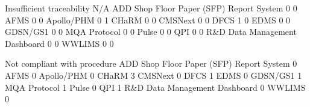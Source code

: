 \documentclass{article}
\begin{document}
\begin{Schunk}
\begin{Soutput}
                                           Insufficient traceability N/A
  ADD Shop Floor Paper (SFP) Report System                         0   0
  AFMS                                                             0   0
  Apollo/PHM                                                       0   1
  CHaRM                                                            0   0
  CMSNext                                                          0   0
  DFCS                                                             1   0
  EDMS                                                             0   0
  GDSN/GS1                                                         0   0
  MQA Protocol                                                     0   0
  Pulse                                                            0   0
  QPI                                                              0   0
  R&D Data Management Dashboard                                    0   0
  WWLIMS                                                           0   0
                                          
                                           Not compliant with procedure
  ADD Shop Floor Paper (SFP) Report System                            0
  AFMS                                                                0
  Apollo/PHM                                                          0
  CHaRM                                                               3
  CMSNext                                                             0
  DFCS                                                                1
  EDMS                                                                0
  GDSN/GS1                                                            1
  MQA Protocol                                                        1
  Pulse                                                               0
  QPI                                                                 1
  R&D Data Management Dashboard                                       0
  WWLIMS                                                              0
                                          

\end{Soutput}
\end{Schunk}
\end{document}
